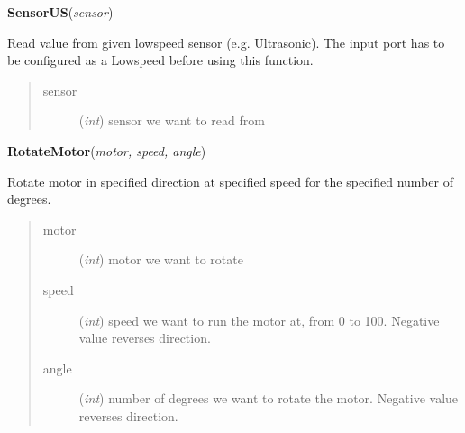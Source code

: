 \documentclass[10pt,a4paper]{article}
\begin{document}
 

\vspace{6pt}
{\bf SensorUS}({\it sensor}) 

    Read value from given lowspeed sensor (e.g. Ultrasonic). The input port 
    has to be configured as a Lowspeed before using this function.
    

    

\begin{quote}
    \begin{description}
        
\item[sensor] ({\emph{int}}) sensor we want to read from

    \end{description}
\end{quote}

 

\vspace{6pt}
{\bf RotateMotor}({\it motor, speed, angle}) 
    
    Rotate motor in specified direction at specified speed for the specified
    number of degrees.




    
    
    

\begin{quote}
    \begin{description}
        
\item[motor] ({\emph{int}}) motor we want to rotate

\item[speed] ({\emph{int}}) speed we want to run the motor at, from 0 to 100. Negative value reverses direction.

\item[angle] ({\emph{int}}) number of degrees we want to rotate the motor. Negative value reverses direction.

    \end{description}
\end{quote}

 
\end{document}
